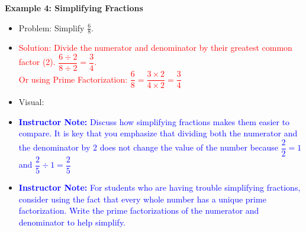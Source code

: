 \documentclass[12pt]{article}
\begin{document}
\begin{tcolorbox}[colframe=black!60, colback=white, 
coltitle=black, colbacktitle=black!15, fonttitle=\bfseries\Large, 
title=Examples with Solutions (Continued), halign title=center, left=10pt, right=10pt, top=10pt, bottom=15pt]



\textbf{Example 4: Simplifying Fractions}
\begin{itemize}
    \item Problem: Simplify \( \frac{6}{8} \).

    \item \textcolor{red}{Solution: Divide the numerator and denominator by their greatest common factor (2). \( \dfrac{6\div2}{8\div2} = \dfrac{3}{4} \). \\ Or using Prime Factorization:  \(\dfrac{6}{8} = \dfrac{3\times 2}{4 \times 2} = \dfrac{3}{4} \) }

\item Visual:
    \begin{center}
    \end{center}

    
    \item \textcolor{blue}{\textbf{Instructor Note:} Discuss how simplifying fractions makes them easier to compare.
    It is key that you emphasize that dividing both the numerator and the denominator by 2 does not change the value of the number because $\dfrac{2}{2} = 1$ and $\dfrac{2}{5} \div 1 = \dfrac{2}{5}$}
      \item \textcolor{blue}{\textbf{Instructor Note:} For students who are having trouble simplifying fractions, consider using the fact that every whole number has a unique prime factorization. Write the prime factorizations of the numerator and denominator to help simplify.}
    
\end{itemize}
\end{tcolorbox}
\end{document}

